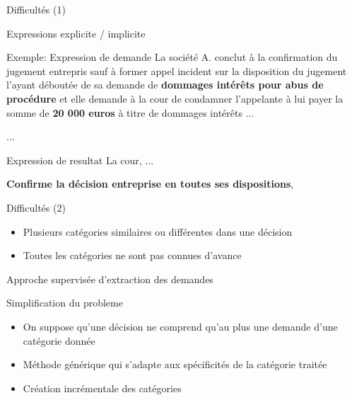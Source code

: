 \documentclass[newPxFont,pagenumber]{beamer}
\begin{document}
\begin{frame}{Difficultés (1)}

Expressions explicite / implicite

\begin{alertblock}{Exemple: Expression de demande}
La société A. conclut à la confirmation du jugement entrepris sauf à
former appel incident sur la disposition du jugement l'ayant déboutée de sa
demande de \textbf{dommages intérêts pour abus de procédure} et elle demande à la cour de
condamner l'appelante à lui payer la somme de \textbf{20 000 euros} à titre de dommages
intérêts ...


...
\end{alertblock}

\begin{alertblock}{Expression de resultat}
La cour, ... 

\textbf{Confirme la décision entreprise en toutes ses dispositions},
\end{alertblock}
\end{frame}

\begin{frame}{Difficultés (2)}

\begin{alertblock}{}
\begin{itemize}
\item Plusieurs catégories similaires ou différentes dans une décision
\item Toutes les catégories ne sont pas connues d'avance
\end{itemize}
\end{alertblock}
\end{frame}


\begin{frame}{Approche supervisée d'extraction des demandes}
\begin{alertblock}{Simplification du probleme}
\begin{itemize}
\item On suppose qu'une décision ne comprend qu'au plus une demande d'une catégorie donnée
\item Méthode générique qui s'adapte aux spécificités de la catégorie traitée
\item Création incrémentale des catégories
\end{itemize}
\end{alertblock}

%
\end{frame}
\end{document}
